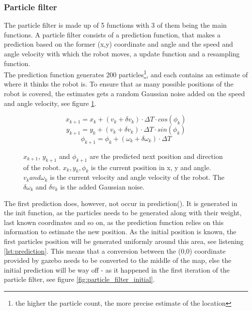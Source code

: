 \documentclass[../../../Main.tex]{subfiles}
\begin{document}
\subsubsection*{Particle filter}
The particle filter is made up of 5 functions with 3 of them being the main functions. A particle filter consists of a prediction function, that makes a prediction based on the former (x,y) coordinate and angle and the speed and angle velocity with which the robot moves, a update function and a resampling function. \\

The prediction function generates 200 particles\footnote{the higher the particle count, the more precise estimate of the location}, and each contains an estimate of where it thinks the robot is.
To ensure that as many possible positions of the robot is covered, the estimates gets a random Gaussian noise added on the speed and angle velocity, see figure \ref{eq:1}.
\begin{figure}[H]
  \begin{equation}
      x_{k+1} = x_k + (v_k + \delta v_k ) \cdot \Delta T \cdot cos(\phi _ k)
  \end{equation}
  \begin{equation}
      y_{k+1} = y_k + (v_k + \delta v_k ) \cdot \Delta T \cdot sin(\phi _ k)
  \end{equation}
  \begin{equation}
      \phi _{k+1} = \phi_k + (\omega _k + \delta \omega _k ) \cdot \Delta T
  \end{equation}
  \caption{ $x_{k+1}$, $y_{k+1}$ and $\phi_{k+1}$ are the predicted next position and direction of the robot. $x_k, y_k, \phi_k$ is the current position in x, y and angle. $v_k and \omega _k$ is the current velocity and angle velocity of the robot. The $\delta \omega _k$ and $\delta v_k$ is the added Gaussian noise.}
   \label{eq:1}
\end{figure}

The first prediction does, however, not occur in prediction(). It is generated in the init function, as the particles needs to be generated along with their weight, last known coordinates and so on, as the prediction function relies on this information to estimate the new position. As the initial position is known, the first particles position will be generated uniformly around this area, see listening \ref{lst:prediction}. This means that a conversion between the (0,0) coordinate provided by gazebo needs to be converted to the middle of the map, else the initial prediction will be way off - as it happened in the first iteration of the particle filter, see figure \ref{fig:particle_filter_initial}.  \\
\end{document}

